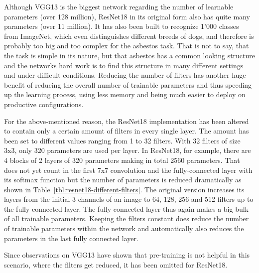 Although VGG13 is the biggest network regarding the number of learnable parameters (over 128 million), ResNet18 in its original form also has quite many parameters (over 11 million). It has also been built to recognize 1'000 classes from ImageNet, which even distinguishes different breeds of dogs, and therefore is probably too big and too complex for the asbestos task. That is not to say, that the task is simple in its nature, but that asbestos has a common looking structure and the networks hard work is to find this structure in many different settings and under difficult conditions. Reducing the number of filters has another huge benefit of reducing the overall number of trainable parameters and thus speeding up the learning process, using less memory and being much easier to deploy on productive configurations.

For the above-mentioned reason, the ResNet18 implementation has been altered to contain only a certain amount of filters in every single layer. The amount has been set to different values ranging from 1 to 32 filters. With 32 filters of size 3x3, only 320 parameters are used per layer. In ResNet18, for example, there are 4 blocks of 2 layers of 320 parameters making in total 2560 parameters. That does not yet count in the first 7x7 convolution and the fully-connected layer with its softmax function but the number of parameters is reduced dramatically as shown in Table~\ref{tbl:resnet18-different-filters}. The original version increases its layers from the initial 3 channels of an image to 64, 128, 256 and 512 filters up to the fully connected layer. The fully connected layer thus again makes a big bulk of all trainable parameters. Keeping the filters constant does reduce the number of trainable parameters within the network and automatically also reduces the parameters in the last fully connected layer.

Since observations on VGG13 have shown that pre-training is not helpful in this scenario, where the filters get reduced, it has been omitted for ResNet18.


